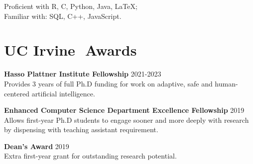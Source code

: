 \documentclass[margin]{res}
\begin{document}
\begin{resume}
Proficient with R, C, Python, Java, \LaTeX;\\ Familiar with:  SQL, C++, JavaScript.

%
%

 

\section{UC Irvine\,\, Awards}

\textbf{Hasso Plattner Institute Fellowship} \hfill 2021-2023\\
Provides 3 years of full Ph.D funding for work on adaptive, safe and human-centered artificial intelligence.

\textbf{Enhanced Computer Science Department Excellence Fellowship} \hfill 2019\\
Allows first-year Ph.D students to engage sooner and more deeply with research by dispensing with teaching assistant requirement.

\textbf{Dean's Award} \hfill 2019\\
Extra first-year grant for outstanding research potential.



\end{resume}
\end{document}
